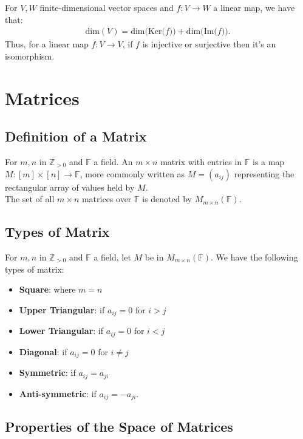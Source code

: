 \documentclass[a4paper, 12pt, twoside]{article}
\begin{document}
For $V, W$ finite-dimensional vector spaces and 
$f : V \to W$ a linear map, we have that: \begin{gather*}
  \text{dim}(V) = \text{dim(Ker(}f)) + \text{dim(Im(}f)).
\end{gather*} Thus, for a linear map $f : V \to V$, if $f$ is
injective or surjective then it's an isomorphism.

\section{Matrices}

\subsection{Definition of a Matrix}

For $m, n$ in $\mathbb{Z}_{>0}$ and $\mathbb{F}$ a field. An
$m \times n$ matrix with entries in $\mathbb{F}$ is a map
$M : [m] \times [n] \to \mathbb{F}$, more commonly written as 
$M = (a_{ij})$ representing the rectangular array of values held
by $M$.
\\[\baselineskip]
The set of all $m \times n$ matrices over $\mathbb{F}$ is denoted by 
$M_{m \times n}(\mathbb{F})$.

\subsection{Types of Matrix}

For $m, n$ in $\mathbb{Z}_{>0}$ and $\mathbb{F}$ a field, let $M$
be in $M_{m \times n}(\mathbb{F})$. We have the following types of
matrix: \begin{itemize}
  \item \textbf{Square}: where $m = n$
  \item \textbf{Upper Triangular}: if $a_{ij} = 0$ for $i > j$
  \item \textbf{Lower Triangular}: if $a_{ij} = 0$ for $i < j$
  \item \textbf{Diagonal}: if $a_{ij} = 0$ for $i \neq j$
  \item \textbf{Symmetric}: if $a_{ij} = a_{ji}$
  \item \textbf{Anti-symmetric}: if $a_{ij} = -a_{ji}$.
\end{itemize}

\subsection{Properties of the Space of Matrices}
\end{document}
